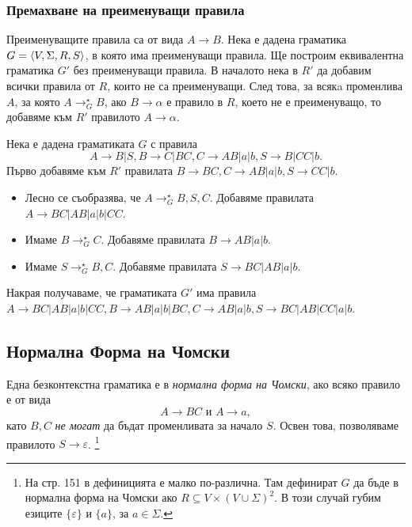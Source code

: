 \subsubsection*{Премахване на преименуващи правила}
Преименуващите правила са от вида $A \to B$.
Нека е дадена граматика $G = \langle{V,\Sigma,R,S}\rangle$, в която има преименуващи правила.
Ще построим еквивалентна граматика $G'$ без преименуващи правила.
В началото нека в $R'$ да добавим всички правила от $R$, които не са преименуващи.
След това, за всякa променлива $A$, за която $A \to^\star_G B$,
ако $B \to \alpha$ е правило в $R$, което не е преименуващо,
то добавяме към $R'$ правилото $A \to \alpha$.

\begin{example}
  Нека е дадена граматиката $G$ с правила  
  \[A\rightarrow B|S,B\rightarrow C|BC,C\rightarrow AB|a|b,S\rightarrow B|CC|b.\]
  Първо добавяме към $R'$ правилата $B \to BC, C \to AB|a|b, S \to CC|b$.
  \begin{itemize}
  \item 
    Лесно се съобразява, че $A \to^\star_G B,S,C$.
    Добавяме правилата $A \to BC|AB|a|b|CC$.
  \item
    Имаме $B \to^\star_G C$.
    Добавяме правилата $B \to AB|a|b$.
  \item
    Имаме $S \to^\star_G B,C$.
    Добавяме правилата $S \to BC|AB|a|b$.
  \end{itemize}
  Накрая получаваме, че граматиката $G'$ има правила
  $A \to BC|AB|a|b|CC, B \to AB|a|b|BC, C \to AB|a|b, S \to BC|AB|CC|a|b$.
\end{example}

\subsection{Нормална Форма на Чомски}

\begin{dfn}
Една безконтекстна граматика е в {\em нормална форма на Чомски}, ако
всяко правило е от вида
\[A \rightarrow BC\mbox{ и }A \rightarrow a,\]
като $B, C$ {\em не могат} да бъдат променливата за начало $S$.
Освен това, позволяваме правилото $S\to\varepsilon$.
\footnote{На стр. 151 в \cite{papadimitriou} дефиницията е малко по-различна.
Там дефинират $G$ да бъде в нормална форма на Чомски ако $R \subseteq V\times(V\cup\Sigma)^2$.
В този случай губим езиците $\{\varepsilon\}$ и $\{a\}$, за $a\in\Sigma$.}
\end{dfn}


